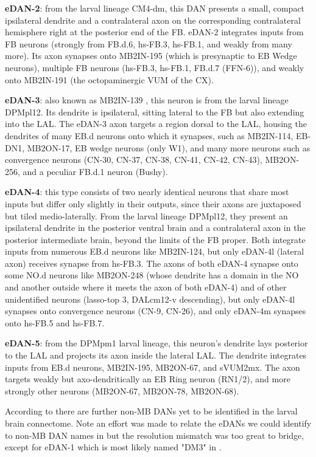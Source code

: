 \textbf{eDAN-2}: from the larval lineage CM4-dm, this DAN presents a small, compact ipsilateral dendrite and a contralateral axon on the corresponding contralateral hemisphere right at the posterior end of the FB. eDAN-2 integrates inputs from FB neurons (strongly from FB.d.6, hs-FB.3, hs-FB.1, and weakly from many more). Its axon synapses onto MB2IN-195 (which is presynaptic to EB Wedge neurons), multiple FB neurons (hs-FB.3, hs-FB.1, FB.d.7 (FFN-6)), and weakly onto MB2IN-191 (the octopaminergic VUM of the CX).

\textbf{eDAN-3}: also known as MB2IN-139 \citep{eschbach2021circuits}, this neuron is from the larval lineage DPMpl12. Its dendrite is ipsilateral, sitting lateral to the FB but also extending into the LAL. The eDAN-3 axon targets a region dorsal to the LAL, housing the dendrites of  many EB.d neurons onto which it synapses, such as MB2IN-114, EB-DN1, MB2ON-17, EB wedge neurons (only W1), and many more neurons such as convergence neurons (CN-30, CN-37, CN-38, CN-41, CN-42, CN-43), MB2ON-256, and a peculiar FB.d.1 neuron (Bushy).

\textbf{eDAN-4}: this type consists of two nearly identical neurons that share most inputs but differ only slightly in their outputs, since their axons are juxtaposed but tiled medio-laterally. From the larval lineage DPMpl12, they present an ipsilateral dendrite in the posterior ventral brain and a contralateral axon in the posterior intermediate brain, beyond the limits of the FB proper. Both integrate inputs from numerous EB.d neurons like MB2IN-124, but only eDAN-4l (lateral axon) receives synapse from hs-FB.3. The axons of both eDAN-4 synapse onto some NO.d neurons like MB2ON-248 (whose dendrite has a domain in the NO and another outside where it meets the axon of both eDAN-4) and of other unidentified neurons (lasso-top 3, DALcm12-v descending), but only eDAN-4l synapses onto convergence neurons (CN-9, CN-26), and only eDAN-4m synapses onto hs-FB.5 and hs-FB.7.

\textbf{eDAN-5}: from the DPMpm1 larval lineage, this neuron's dendrite lays posterior to the LAL and projects its axon inside the lateral LAL. The dendrite integrates inputs from EB.d neurons, MB2IN-195, MB2ON-67, and sVUM2mx. The axon targets weakly but axo-dendritically an EB Ring neuron (RN1/2), and more strongly other neurons (MB2ON-67, MB2ON-78, MB2ON-68).

According to \citep{selcho2009thgal4} there are further non-MB DANs yet to be identified in the larval brain connectome. Note an effort was made to relate the eDANs we could identify to non-MB DAN names in \citep{selcho2009thgal4} but the resolution mismatch was too great to bridge, except for eDAN-1 which is most likely named "DM3" in \citep{selcho2009thgal4}.

